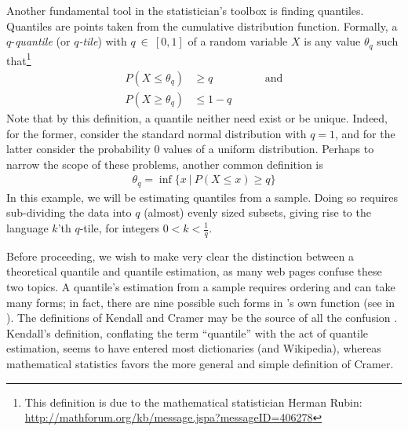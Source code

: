 Another fundamental tool in the statistician's toolbox is finding quantiles.  Quantiles are points taken from the cumulative distribution function.  Formally, a $q$-\emph{quantile} (or \emph{$q$-tile}) with $q~\in~[0,1]$ of a random variable $X$ is any value $\theta_q$ such that\footnote{This definition is due to the mathematical statistician Herman Rubin:  \url{http://mathforum.org/kb/message.jspa?messageID=406278}}
\begin{align*}
P(X\leq \theta_q) &\geq q\hspace{2cm}\text{and}\\
P(X\geq \theta_q) &\leq 1-q
\end{align*}
Note that by this definition, a quantile neither need exist or be unique.  Indeed, for the former, consider the standard normal distribution with $q=1$, and for the latter consider the probability 0 values of a uniform distribution.  Perhaps to narrow the scope of these problems, another common definition is
\begin{align*}
\theta_q = \inf \{x\ |\ P(X\leq x) \geq q\}
\end{align*}
In this example, we will be estimating quantiles from a sample.  Doing so requires sub-dividing the data into $q$ (almost) evenly sized subsets, giving rise to the language $k$'th $q$-tile, for integers $0<k<\frac{1}{q}$.

Before proceeding, we wish to make very clear the distinction between a theoretical quantile and quantile estimation, as many web pages confuse these two topics.  A quantile's estimation from a sample requires ordering and can take many forms; in fact, there are nine possible such forms in 's own  function (see  in ).  The definitions of Kendall and Cramer may be the source of all the confusion \citep{quantilemess}.  Kendall's definition, conflating the term ``quantile'' with the act of quantile estimation, seems to have entered most dictionaries (and Wikipedia), whereas mathematical statistics favors the more general and simple definition of Cramer.

